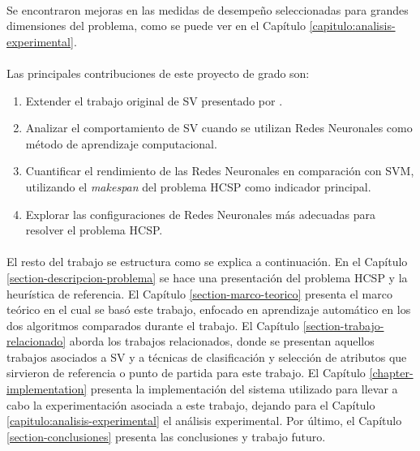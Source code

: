 \paragraph{} Se encontraron mejoras en las medidas de desempeño seleccionadas para grandes dimensiones del problema, como se puede ver en el Capítulo \ref{capitulo:analisis-experimental}.

\paragraph{}Las principales contribuciones de este proyecto de grado son:
\begin{enumerate}
    \item Extender el trabajo original de SV presentado por \citet{savant-original}.
    \item Analizar el comportamiento de SV cuando se utilizan Redes Neuronales como método de aprendizaje computacional.
    \item Cuantificar el rendimiento de las Redes Neuronales en comparación con SVM, utilizando el \textit{makespan} del problema HCSP como indicador principal.
    \item Explorar las configuraciones de Redes Neuronales más adecuadas para resolver el problema HCSP.
\end{enumerate}

\paragraph{} El resto del trabajo se estructura como se explica a continuación.
En el Capítulo \ref{section-descripcion-problema} se hace una presentación del problema HCSP y la heurística de referencia. El Capítulo \ref{section-marco-teorico} presenta el marco teórico en el cual se basó este trabajo, enfocado en aprendizaje automático en los dos algoritmos comparados durante el trabajo.
El Capítulo \ref{section-trabajo-relacionado} aborda los trabajos relacionados, donde se presentan aquellos trabajos asociados a SV y a técnicas de clasificación y selección de atributos que sirvieron de referencia o punto de partida para este trabajo.
El Capítulo \ref{chapter-implementation} presenta la implementación del sistema utilizado para llevar a cabo la experimentación asociada a este trabajo, dejando para el Capítulo \ref{capitulo:analisis-experimental} el análisis experimental.
Por último, el Capítulo \ref{section-conclusiones} presenta las conclusiones y trabajo futuro.